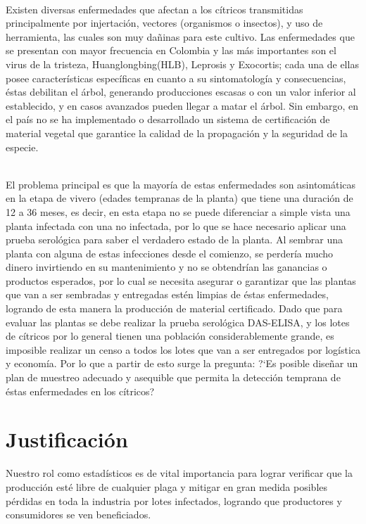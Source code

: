 ~\\Existen diversas enfermedades que afectan a los c\'{i}tricos transmitidas principalmente por injertaci\'{o}n, vectores (organismos o insectos), y uso de herramienta, las cuales son muy da\~{n}inas para este cultivo. Las enfermedades que se presentan con mayor frecuencia en Colombia y las m\'{a}s importantes son el virus de la tristeza, Huanglongbing(HLB), Leprosis y Exocortis; cada una de ellas posee caracter\'{i}sticas espec\'{i}ficas en cuanto a su sintomatolog\'{i}a y consecuencias, \'{e}stas debilitan el \'{a}rbol, generando producciones escasas o con un valor inferior al establecido, y en casos avanzados pueden llegar a matar el \'{a}rbol. Sin embargo, en el pa\'{i}s no se ha implementado o desarrollado un sistema de certificaci\'{o}n de material vegetal que garantice la calidad de la propagaci\'{o}n y la seguridad de la especie.

~\\El problema principal es que la mayor\'{i}a de estas enfermedades son asintom\'{a}ticas en la etapa de vivero (edades tempranas de la planta) que tiene una duraci\'{o}n de 12 a 36 meses, es decir, en esta etapa no se puede diferenciar a simple vista una planta infectada con una no infectada, por lo que se hace necesario aplicar una prueba serol\'{o}gica para saber el verdadero estado de la planta. Al sembrar una planta con alguna de estas infecciones desde el comienzo, se perder\'{i}a mucho dinero invirtiendo en su mantenimiento y no se obtendr\'{i}an las ganancias o productos esperados, por lo cual se necesita asegurar o garantizar que las plantas que van a ser sembradas y entregadas est\'{e}n limpias de \'{e}stas enfermedades, logrando de esta manera la producci\'{o}n de material certificado. Dado que para evaluar las plantas se debe realizar la prueba serol\'{o}gica DAS-ELISA, y los lotes de c\'{i}tricos por lo general tienen una poblaci\'{o}n considerablemente grande, es imposible realizar un censo a todos los lotes que van a ser entregados por log\'{i}stica y econom\'{i}a. Por lo que a partir de esto surge la pregunta: ?`Es posible dise\~{n}ar un plan de muestreo adecuado y asequible que permita la detecci\'{o}n temprana de \'{e}stas enfermedades en los c\'{i}tricos?


\section{Justificaci\'{o}n}
Nuestro rol como estad\'{i}sticos es de vital importancia para lograr verificar que la producci\'{o}n est\'{e} libre de cualquier plaga y mitigar en gran medida posibles p\'{e}rdidas en toda la industria por lotes infectados, logrando que productores y consumidores se ven beneficiados.

